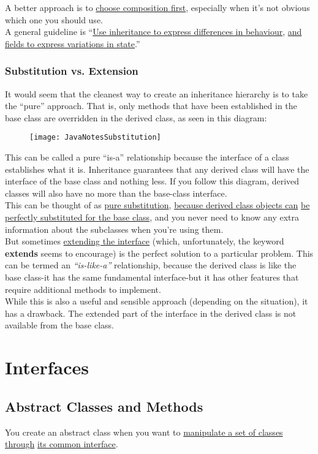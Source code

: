 \documentclass[10pt,letterpaper]{report}
\begin{document}
A better approach is to \underline{choose composition first}, especially when it's not obvious which one you should use.\\

A general guideline is ``\underline{Use inheritance to express differences in behaviour}, \underline{and fields to express variations in state}.''
\subsection{Substitution vs. Extension}
It would seem that the cleanest way to create an inheritance hierarchy is to take the ``pure'' approach. That is, only methods that have been established in the base class are overridden in the derived class, as seen in this diagram:
\begin{figure}[htb]
\centering
\texttt{[image: JavaNotesSubstitution]}
\end{figure}

This can be called a pure ``is-a'' relationship because the interface of a class establishes what it is. Inheritance guarantees that any derived class will have the interface of the base class and nothing less. If you follow this diagram, derived classes will also have no more than the base-class interface.\\
This can be thought of as \underline{pure substitution}, \underline{because derived class objects can} \underline{be perfectly substituted for the base class}, and you never need to know any extra information about the subclasses when you're using them.\\

But sometimes \underline{extending the interface} (which, unfortunately, the keyword \textbf{extends} seems to encourage) is the perfect solution to a particular problem. This can be termed an \textit{``is-like-a''} relationship, because the derived class is like the base class-it has the same fundamental interface-but it has other features that require additional methods to implement.\\

While this is also a useful and sensible approach (depending on the situation), it has a drawback. The extended part of the interface in the derived class is not available from the base class.
\chapter{Interfaces}
\section{Abstract Classes and Methods}
You create an abstract class when you want to \underline{manipulate a set of classes} \underline{through} \underline{its common interface}.\\
\end{document}
